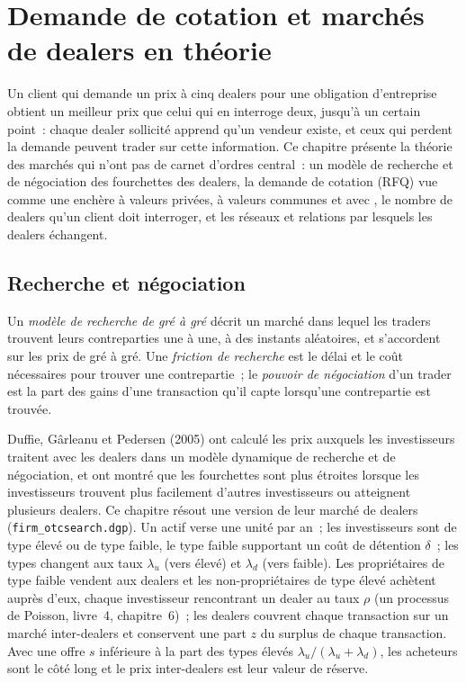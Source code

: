 \chapter{Demande de cotation et marchés de dealers en théorie}\label{ch:mx:request-for-quote-and-dealer-markets-in-theory}

Un client qui demande un prix à cinq dealers pour une obligation d'entreprise obtient un meilleur prix que celui qui en interroge deux, jusqu'à un certain point~: chaque dealer sollicité apprend
qu'un vendeur existe, et ceux qui perdent la demande peuvent trader sur cette information. Ce chapitre présente la théorie des marchés qui n'ont pas de carnet d'ordres central~: un modèle de recherche et de négociation des
fourchettes des dealers, la demande de cotation (RFQ) vue comme une enchère à valeurs privées, à valeurs communes et avec , le
nombre de dealers qu'un client doit interroger, et les réseaux et relations par lesquels les dealers échangent.

\section{Recherche et négociation}

\begin{definition}\label{def:mx:request-for-quote-and-dealer-markets-in-theory:search}
Un \emph{modèle de recherche de gré à gré} décrit un marché dans lequel les traders trouvent leurs contreparties une à une,
à des instants aléatoires, et s'accordent sur les prix de gré à gré. Une \emph{friction de recherche} est le délai et le coût nécessaires pour trouver une contrepartie~; le
\emph{pouvoir de négociation} d'un trader est la part des gains d'une transaction qu'il capte lorsqu'une contrepartie est trouvée.
\end{definition}

Duffie, Gârleanu et Pedersen (2005) ont calculé les prix auxquels les investisseurs traitent avec les dealers dans un modèle dynamique de recherche et de négociation, et ont montré
que les fourchettes sont plus étroites lorsque les investisseurs trouvent plus facilement d'autres investisseurs ou atteignent plusieurs dealers. Ce chapitre résout une version de leur
marché de dealers (\texttt{firm\_otcsearch.dgp}). Un actif verse une unité par an~; les investisseurs sont de type élevé ou de type faible, le type faible supportant un coût de détention
$\delta$~; les types changent aux taux $\lambda_u$ (vers élevé) et $\lambda_d$ (vers faible). Les propriétaires de type faible vendent aux dealers et les non-propriétaires de type élevé achètent auprès d'eux,
chaque investisseur rencontrant un dealer au taux $\rho$ (un processus de Poisson, livre~4, chapitre~6)~; les dealers couvrent chaque transaction sur un marché inter-dealers et conservent une
part $z$ du surplus de chaque transaction. Avec une offre $s$ inférieure à la part des types élevés $\lambda_u/(\lambda_u+\lambda_d)$, les acheteurs sont le côté long et le
prix inter-dealers est leur valeur de réserve.

